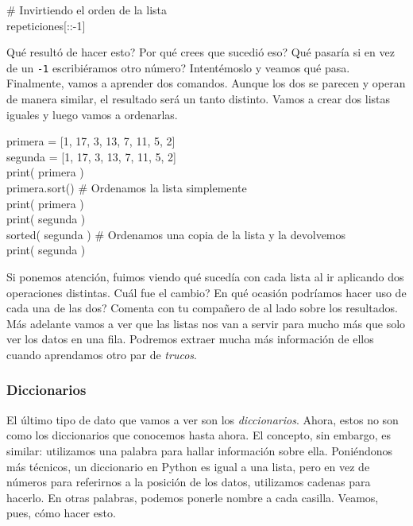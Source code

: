 \documentclass[10pt,letterpaper]{article}
\newcommand{\inlinecode}[1]{
\colorbox{light-gray}{\texttt{#1}}
}
\newenvironment{Code}
{
\begin{lrbox}{\selvestebox}%
\begin{minipage}{\dimexpr\columnwidth-2\fboxsep\relax}
\fontfamily{\ttdefault}\selectfont
}
{\end{minipage}\end{lrbox}%
\begin{center}
\colorbox{light-gray}{\usebox{\selvestebox}}
\end{center}
}
\begin{document}
\begin{Code}
\# Invirtiendo el orden de la lista\\
repeticiones[::-1]
\end{Code}

Qu\'e result\'o de hacer esto? Por qu\'e crees que sucedi\'o eso? Qu\'e pasar\'ia si en vez de un \inlinecode{-1} escribi\'eramos otro n\'umero? Intent\'emoslo y veamos qu\'e pasa.\\

Finalmente, vamos a aprender dos comandos. Aunque los dos se parecen y operan de manera similar, el resultado ser\'a un tanto distinto. Vamos a crear dos listas iguales y luego vamos a ordenarlas.

\begin{Code}
primera = [1, 17, 3, 13, 7, 11, 5, 2]\\
segunda = [1, 17, 3, 13, 7, 11, 5, 2]\\
print( primera )\\
primera.sort() \# Ordenamos la lista simplemente\\
print( primera )\\
print( segunda )\\
sorted( segunda ) \# Ordenamos una copia de la lista y la devolvemos\\
print( segunda )
\end{Code}

Si ponemos atenci\'on, fuimos viendo qu\'e suced\'ia con cada lista al ir aplicando dos operaciones distintas. Cu\'al fue el cambio? En qu\'e ocasi\'on podr\'iamos hacer uso de cada una de las dos? Comenta con tu compa\~nero de al lado sobre los resultados.\\

M\'as adelante vamos a ver que las listas nos van a servir para mucho m\'as que solo ver los datos en una fila. Podremos extraer mucha m\'as informaci\'on de ellos cuando aprendamos otro par de \emph{trucos}.

\subsubsection{Diccionarios}
El \'ultimo tipo de dato que vamos a ver son los \emph{diccionarios}. Ahora, estos no son como los diccionarios que conocemos hasta ahora. El concepto, sin embargo, es similar: utilizamos una palabra para hallar informaci\'on sobre ella. Poni\'endonos m\'as t\'ecnicos, un diccionario en Python es igual a una lista, pero en vez de n\'umeros para referirnos a la posici\'on de los datos, utilizamos cadenas para hacerlo. En otras palabras, podemos ponerle nombre a cada casilla. Veamos, pues, c\'omo hacer esto.\\
\end{document}
